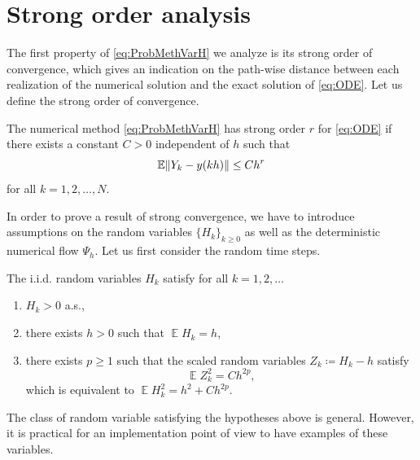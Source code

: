 \documentclass{siamart1116}
\numberwithin{theorem}{section}
\DeclarePairedDelimiter{\norm}{\|}{\|}
\newcommand{\defeq}{\coloneqq}
\newcommand{\E}{\operatorname{\mathbb{E}}}
\begin{document}
\section{Strong order analysis}\label{sec:StrongOrder}

The first property of \eqref{eq:ProbMethVarH} we analyze is its strong order of convergence, which gives an indication on the path-wise distance between each realization of the numerical solution and the exact solution of \eqref{eq:ODE}. Let us define the strong order of convergence. 
\begin{definition} The numerical method \eqref{eq:ProbMethVarH} has strong order $r$ for \eqref{eq:ODE} if there exists a constant $C > 0$ independent of $h$ such that
	\begin{equation}
	\E\norm{Y_k - y(kh)} \leq Ch^r
	\end{equation}
	for all $k = 1, 2, \ldots, N$.
\end{definition} 
In order to prove a result of strong convergence, we have to introduce assumptions on the random variables $\{H_k\}_{k\geq 0}$ as well as the deterministic numerical flow $\Psi_h$. Let us first consider the random time steps.
\begin{assumption}\label{as:hStrong} The i.i.d. random variables $H_k$ satisfy for all $k = 1, 2, \ldots$
	\begin{enumerate}
		\item $H_k > 0$ a.s.,
		\item there exists $h > 0$ such that $\E H_k = h$,
		\item there exists $p \geq 1$ such that the scaled random variables $Z_k \defeq H_k - h$ satisfy
		\begin{equation}
			\E Z_k^2 = Ch^{2p},
		\end{equation}
		which is equivalent to $\E H_k^2 = h^2 + Ch^{2p}$.
	\end{enumerate}
\end{assumption}
The class of random variable satisfying the hypotheses above is general. However, it is practical for an implementation point of view to have examples of these variables.
\end{document}
